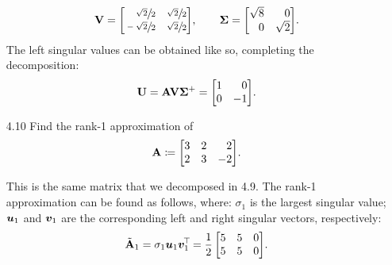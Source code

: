 \documentclass[11pt]{article}
\begin{document}
\begin{enumerate}
          \[
              \mat{V} =
              \begin{bmatrix*}[r]
                  \sfrac{\sqrt{2}}{2} & \sfrac{\sqrt{2}}{2} \\
                  \sfrac{-\sqrt{2}}{2} & \sfrac{\sqrt{2}}{2} \\
              \end{bmatrix*}
              \! ,
              \qquad
              \mat{\Sigma}
              =
              \begin{bmatrix*}[r]
                  \sqrt{8} & 0 \\
                  0 & \sqrt{2} \\
              \end{bmatrix*}
              \! .
          \]
          The left singular values can be obtained like so, completing the decomposition:
          \[
              \mat{U} = \mat{A} \mat{V} \mat{\Sigma}^+
              =
              \begin{bmatrix*}[r]
                  1 & 0 \\
                  0 & -1 \\
              \end{bmatrix*}
              \! .
          \]

    \item[4.10] Find the rank-1 approximation of
          \[
              \mat{A} \coloneq
              \begin{bmatrix*}[r]
                  3 & 2 & 2 \\
                  2 & 3 & -2 \\
              \end{bmatrix*}
              \! .
          \]

          This is the same matrix that we decomposed in 4.9.  The rank-1 approximation can be found
          as follows, where: $\sigma_1$ is the largest singular value; $\bm{u}_1$ and $\bm{v}_1$
          are the corresponding left and right singular vectors, respectively:
          \[
              \tilde{\mathbf{A}}_1 = \sigma_1 \bm{u}_1 \bm{v}_1^{\mkern-2.5mu\top\mkern-2mu}
              =
              \frac{1}{2}
              \begin{bmatrix}
                  5 & 5 & 0 \\
                  5 & 5 & 0 \\
              \end{bmatrix}
              \! .
          \]

          \pagebreak


\end{enumerate}
\end{document}
